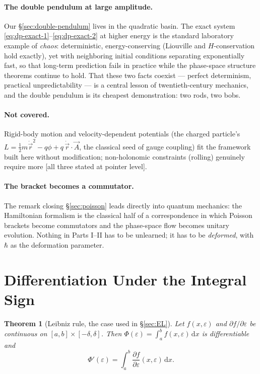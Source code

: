 \documentclass[11pt]{article}
\theoremstyle{plain}
\newtheorem{theorem}{Theorem}[section]
\theoremstyle{definition}
\theoremstyle{remark}
\newcommand{\dd}{\mathrm{d}}
\newcommand{\pd}[2]{\frac{\partial #1}{\partial #2}}
\newcommand{\vr}{\vec{r}}
\begin{document}
\paragraph{The double pendulum at large amplitude.}
Our \S\ref{sec:double-pendulum} lives in the quadratic basin. The exact
system \eqref{eq:dp-exact-1}--\eqref{eq:dp-exact-2} at higher energy is
the standard laboratory example of \emph{chaos}: deterministic,
energy-conserving (Liouville and $H$-conservation hold exactly), yet with
neighboring initial conditions separating exponentially fast, so that
long-term prediction fails in practice while the phase-space structure
theorems continue to hold. That these two facts coexist --- perfect
determinism, practical unpredictability --- is a central lesson of
twentieth-century mechanics, and the double pendulum is its cheapest
demonstration: two rods, two bobs.

\paragraph{Not covered.}
Rigid-body motion and velocity-dependent potentials (the charged
particle's $L = \tfrac12 m\dot{\vr}^2 - q\phi + q\,\dot{\vr}\cdot
\vec A$, the classical seed of gauge coupling) fit the framework
built here without modification; non-holonomic constraints (rolling)
genuinely require more [all three stated at pointer level].

\paragraph{The bracket becomes a commutator.}
The remark closing \S\ref{sec:poisson} leads directly into quantum
mechanics:
the Hamiltonian formalism is the classical half of a correspondence in
which Poisson brackets become commutators and the phase-space flow becomes
unitary evolution. Nothing in Parts I--II has to be unlearned; it has to
be \emph{deformed}, with $\hbar$ as the deformation parameter.

\appendix

\section{Differentiation Under the Integral Sign}
\label{app:diff-under-integral}

\begin{theorem}[Leibniz rule, the case used in \S\ref{sec:EL}]
Let $f(x,\varepsilon)$ and $\partial f/\partial\varepsilon$ be continuous
on $[a,b]\times[-\delta,\delta]$. Then
$\Phi(\varepsilon) = \int_a^b f(x,\varepsilon)\,\dd x$ is differentiable
and
\begin{equation}
  \Phi'(\varepsilon) = \int_a^b \pd{f}{\varepsilon}(x,\varepsilon)\,\dd x .
\end{equation}
\end{theorem}
\end{document}
